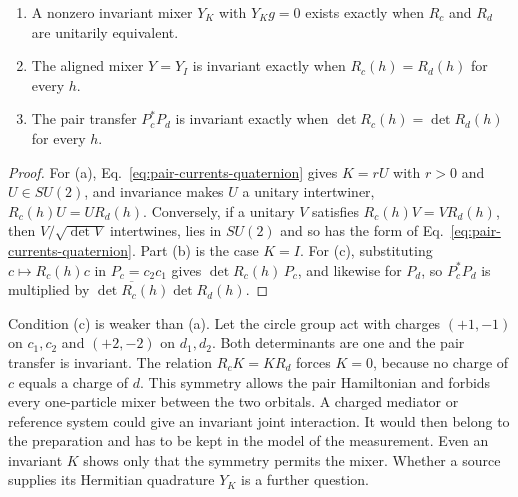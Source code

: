 \begin{proposition}
\label{prop:pair-currents-invariant-mixer}
\begin{enumerate}
\item[(a)] A nonzero invariant mixer $Y_K$ with $Y_Kg=0$ exists exactly when $R_c$ and $R_d$ are unitarily equivalent.
\item[(b)] The aligned mixer $Y=Y_I$ is invariant exactly when $R_c(h)=R_d(h)$ for every $h$.
\item[(c)] The pair transfer $P_c^*P_d$ is invariant exactly when $\det R_c(h)=\det R_d(h)$ for every $h$.
\end{enumerate}
\end{proposition}
\begin{proof}
For (a), Eq.~\eqref{eq:pair-currents-quaternion} gives $K=rU$ with $r>0$ and $U\in SU(2)$, and invariance makes $U$ a unitary intertwiner, $R_c(h)U=UR_d(h)$. Conversely, if a unitary $V$ satisfies $R_c(h)V=VR_d(h)$, then $V/\sqrt{\det V}$ intertwines, lies in $SU(2)$ and so has the form of Eq.~\eqref{eq:pair-currents-quaternion}. Part (b) is the case $K=I$. For (c), substituting $c\mapsto R_c(h)c$ in $P_c=c_2c_1$ gives $\det R_c(h)\,P_c$, and likewise for $P_d$, so $P_c^*P_d$ is multiplied by $\overline{\det R_c(h)}\det R_d(h)$.
\end{proof}

Condition (c) is weaker than (a). Let the circle group act with charges $(+1,-1)$ on $c_1,c_2$ and $(+2,-2)$ on $d_1,d_2$. Both determinants are one and the pair transfer is invariant. The relation $R_cK=KR_d$ forces $K=0$, because no charge of $c$ equals a charge of $d$. This symmetry allows the pair Hamiltonian and forbids every one-particle mixer between the two orbitals. A charged mediator or reference system could give an invariant joint interaction. It would then belong to the preparation and has to be kept in the model of the measurement. Even an invariant $K$ shows only that the symmetry permits the mixer. Whether a source supplies its Hermitian quadrature $Y_K$ is a further question.

